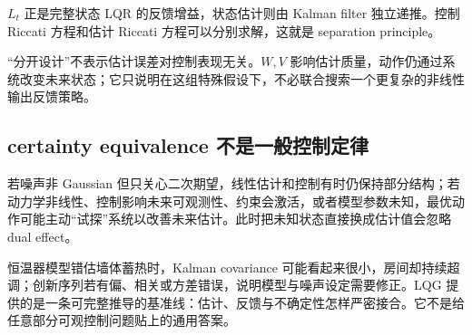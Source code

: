\(L_t\) 正是完整状态 LQR 的反馈增益，状态估计则由 Kalman filter 独立递推。控制 Riccati 方程和估计 Riccati 方程可以分别求解，这就是 separation principle。

``分开设计''不表示估计误差对控制表现无关。\(W,V\) 影响估计质量，动作仍通过系统改变未来状态；它只说明在这组特殊假设下，不必联合搜索一个更复杂的非线性输出反馈策略。

\subsection{certainty equivalence 不是一般控制定律}

若噪声非 Gaussian 但只关心二次期望，线性估计和控制有时仍保持部分结构；若动力学非线性、控制影响未来可观测性、约束会激活，或者模型参数未知，最优动作可能主动``试探''系统以改善未来估计。此时把未知状态直接换成估计值会忽略 dual effect。

恒温器模型错估墙体蓄热时，Kalman covariance 可能看起来很小，房间却持续超调；创新序列若有偏、相关或方差错误，说明模型与噪声设定需要修正。LQG 提供的是一条可完整推导的基准线：估计、反馈与不确定性怎样严密接合。它不是给任意部分可观控制问题贴上的通用答案。
